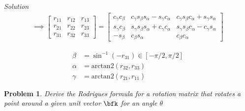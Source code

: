\documentclass{article}
\newtheorem{prob}{Problem}
\numberwithin{prob}{section}
\newenvironment{solution}{\emph{Solution}}{}
\begin{document}
\begin{solution}
\begin{align}
  \implies \begin{bmatrix}
    r_{11} & r_{12} & r_{13}  \\
    r_{21} & r_{22} & r_{23}  \\
    r_{31} & r_{32} & r_{33}  
  \end{bmatrix}
  = \begin{bmatrix}
    c_\gamma c_\beta &
    c_\gamma s_\beta s_\alpha - s_\gamma c_\alpha &
    c_\gamma s_\beta c_\alpha + s_\gamma s_\alpha
    \\
    s_\gamma c_\beta &
    s_\gamma s_\beta s_\alpha + c_\gamma c_\alpha &
    s_\gamma s_\beta c_\alpha - c_\gamma s_\alpha
    \\
    -s_\beta & c_\beta s_\alpha & c_\beta c_\alpha
  \end{bmatrix}
\end{align}

\begin{align}
  \beta &= \sin^{-1}(-r_{31}) \in [-\pi/2, \pi/2]\\
  \alpha &= \text{arctan2}(r_{32}, r_{33}) \\
  \gamma &= \text{arctan2}(r_{21}, r_{11})
\end{align}

\end{solution}

\begin{prob}
  Derive the Rodrigues formula for a rotation matrix that rotates a point around a given unit vector $\bfk$ for an angle $\theta$
\end{prob}
\end{document}

